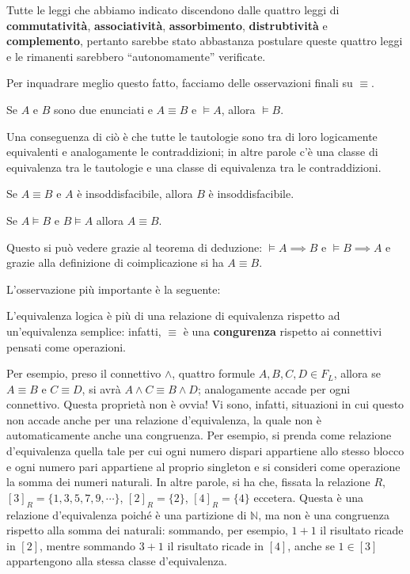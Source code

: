 Tutte le leggi che abbiamo indicato discendono dalle 
quattro leggi di \textbf{commutatività}, \textbf{associatività}, 
\textbf{assorbimento}, \textbf{distrubtività} e \textbf{complemento}, 
pertanto sarebbe stato abbastanza postulare queste quattro 
leggi e le rimanenti sarebbero ``autonomamente'' verificate. 

Per inquadrare meglio questo fatto, 
facciamo delle osservazioni finali su $\equiv$. 
\begin{oss}
Se $A$ e $B$ sono due enunciati e $A \equiv B$ e $\models A$,
allora $\models B$.
\end{oss}
Una conseguenza di ciò è che tutte le tautologie sono tra di loro logicamente 
equivalenti e analogamente le contraddizioni; in altre parole c'è una classe di equivalenza tra 
le tautologie e una classe di equivalenza tra le 
contraddizioni. 

\begin{oss}
Se $A \equiv B$ e $A$ è insoddisfacibile, allora $B$ 
è insoddisfacibile. 
\end{oss}

\begin{oss}
Se $A \models B$ e $B \models A$ allora $A \equiv B$. 
\end{oss}
Questo si può vedere grazie al teorema di deduzione: 
$ \models A \implies B$ e $ \models B \implies A$ e 
grazie alla definizione di coimplicazione 
si ha $A \equiv B$. 


L'osservazione più importante è la seguente: 
\begin{oss}
L'equivalenza logica è più di una relazione di equivalenza
rispetto ad un'equivalenza semplice: infatti, $\equiv$ è 
una \textbf{congurenza} rispetto ai connettivi pensati 
come operazioni.
\end{oss}
Per esempio, preso il connettivo $\land$, quattro formule $A, B, C, D \in F_L$, 
allora se $A \equiv B$ e $C \equiv D$, si avrà $A \land C \equiv B \land D$; 
analogamente accade per ogni connettivo. Questa proprietà non è 
ovvia! Vi sono, infatti, situazioni in cui questo non accade anche per una 
relazione d'equivalenza, la quale non è automaticamente 
anche una congruenza. Per esempio,  si prenda come relazione d'equivalenza 
quella tale per cui ogni numero dispari appartiene allo stesso blocco e ogni 
numero pari appartiene al proprio singleton e si consideri come operazione 
la somma dei numeri naturali. In altre parole, si ha che, fissata la relazione 
$R$, $[3]_R = \{1, 3, 5, 7, 9, \cdots\}$, $[2]_R = \{2\}$, $[4]_R = \{4\}$ eccetera. 
Questa è una relazione d'equivalenza poiché è una partizione di $\mathbb{N}$, 
ma non è una congruenza rispetto alla somma dei naturali: sommando, per esempio, 
$1+1$ il risultato ricade in $[2]$, mentre sommando $3+1$ il risultato 
ricade in $[4]$, anche se $1 \in [3]$ appartengono alla stessa classe d'equivalenza. 

